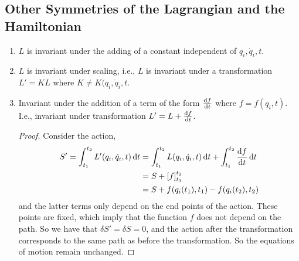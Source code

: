 \documentclass{book}
\begin{document}
\subsection{Other Symmetries of the Lagrangian and the Hamiltonian}
\begin{enumerate}
	\item $L$ is invariant under the adding of a constant independent of $q_i, \Dot{q}_i, t$.
	\item $L$ is invariant under scaling, i.e., $L$ is invariant under a transformation $L' = KL$ where $K \neq K(q_i, \Dot{q}_i, t$.
	\item Invariant under the addition of a term of the form $\dv{f}{t}$ where $f = f(q_i, t)$. I.e., invariant under transformation $L' = L + \dv{f}{t}$.
	\begin{proof}
		Consider the action,
		\begin{equation}
			\begin{split}
				S' = \int_{t_1}^{t_2}L'(q_i, \dot{q}_i, t)\dd{t} & = \int_{t_1}^{t_2}L(q_i, \Dot{q}_i, t)\dd{t} + \int_{t_1}^{t_2}\dv{f}{t} \dd{t} \\
				& = S + \left[f\right]_{t_1}^{t_2} \\
				& = S + f(q_i(t_1), t_1) - f(q_i(t_2), t_2)
			\end{split}
		\end{equation}
		and the latter terms only depend on the end points of the action. These points are fixed, which imply that the function $f$ does not depend on the path. So we have that $\delta S' = \delta S = 0$, and the action after the transformation corresponds to the same path as before the transformation. So the equations of motion remain unchanged.
	\end{proof} 
\end{enumerate}
\end{document}
